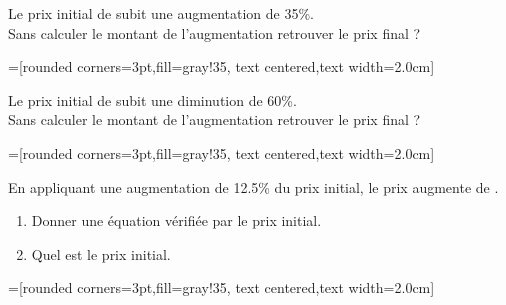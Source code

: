 \documentclass[main.tex]{subfiles}
\begin{document}
\begin{exercise}\hfill 
	
	\noindent\parbox{0.70\linewidth}{
	Le prix initial de  subit une augmentation de 35\%. \\
	Sans calculer le montant de l'augmentation retrouver le prix final ? 
}\parbox{0.23\linewidth}{
=[rounded corners=3pt,fill=gray!35, text centered,text width=2.0cm]
}	
\end{exercise}
\begin{exercise}\hfill 
	
	\noindent\parbox{0.70\linewidth}{
Le prix initial de  subit une diminution de 60\%.\\
Sans calculer le montant de l'augmentation retrouver le prix final ?  
}\parbox{0.23\linewidth}{
=[rounded corners=3pt,fill=gray!35, text centered,text width=2.0cm]
}	 
\end{exercise}
\begin{exercise}\hfill 
	
	\noindent\parbox{0.70\linewidth}{
En appliquant une augmentation de 12.5\% du prix initial, le prix augmente de . 
	\begin{enumerate}[label=\alph*), leftmargin=*]
		\item Donner une équation vérifiée par le prix initial. \dotfill 
		\item Quel est le prix initial.\dotfill
	\end{enumerate} 
 }\parbox{0.23\linewidth}{
=[rounded corners=3pt,fill=gray!35, text centered,text width=2.0cm]
}	 
\end{exercise}
\end{document}
